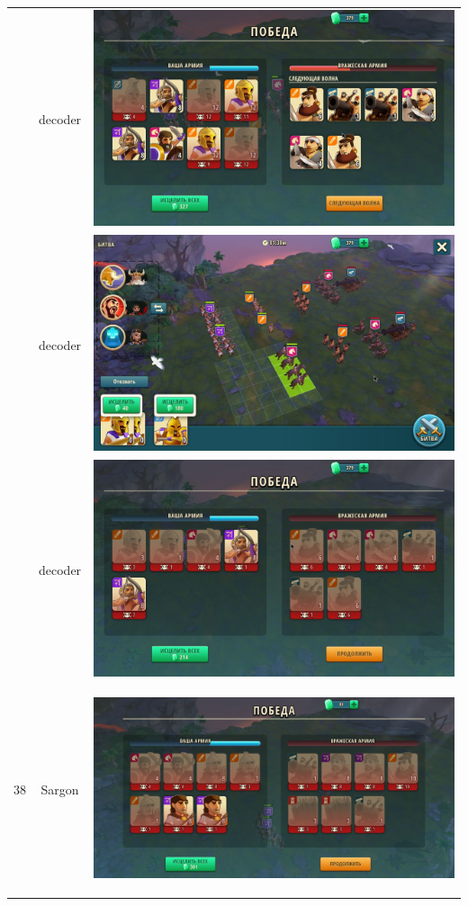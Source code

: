 \begin{longtable}{|c|c|c|}
	& decoder &
	\includegraphics[width=0.75\linewidth]{./parts/media/TreasureHunt/37/decoder/photo_2022-04-14_12-36-38.jpg} \\
	& decoder &
	\includegraphics[width=0.75\linewidth]{./parts/media/TreasureHunt/37/decoder/photo_2022-04-14_12-36-42.jpg} \\
	& decoder &
	\includegraphics[width=0.75\linewidth]{./parts/media/TreasureHunt/37/decoder/photo_2022-04-14_12-36-46.jpg} \\
	\hline
	\multirow{12}{*}{38} & Sargon &
	\hypertarget{fight38}{\includegraphics[width=0.75\linewidth]{./parts/media/TreasureHunt/38/sargon/photo_2022-04-07_13-17-35.jpg}} \\

\end{longtable}

